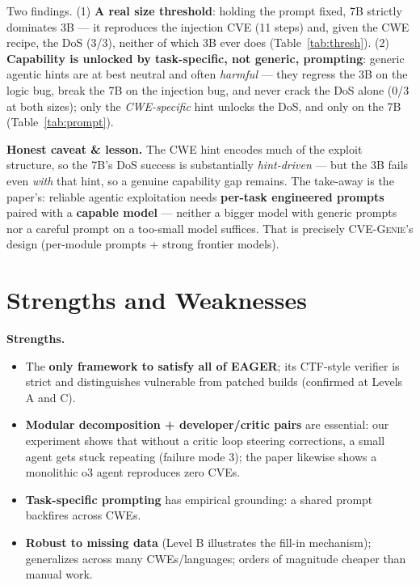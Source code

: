 \documentclass[conference,10pt,a4paper]{IEEEtran}
\begin{document}
Two findings. (1) \textbf{A real size threshold}: holding the prompt fixed, 7B strictly dominates 3B --- it reproduces the injection CVE (11 steps) and, given the CWE recipe, the DoS (3/3), neither of which 3B ever does (Table~\ref{tab:thresh}). (2) \textbf{Capability is unlocked by task-specific, not generic, prompting}: generic agentic hints are at best neutral and often \textit{harmful} --- they regress the 3B on the logic bug, break the 7B on the injection bug, and never crack the DoS alone (0/3 at both sizes); only the \textit{CWE-specific} hint unlocks the DoS, and only on the 7B (Table~\ref{tab:prompt}).

\textbf{Honest caveat \& lesson.} The CWE hint encodes much of the exploit structure, so the 7B's DoS success is substantially \textit{hint-driven} --- but the 3B fails even \textit{with} that hint, so a genuine capability gap remains. The take-away is the paper's: reliable agentic exploitation needs \textbf{per-task engineered prompts} paired with a \textbf{capable model} --- neither a bigger model with generic prompts nor a careful prompt on a too-small model suffices. That is precisely CVE-G\textsc{enie}'s design (per-module prompts + strong frontier models).

\section{Strengths and Weaknesses}

\textbf{Strengths.}
\begin{itemize}
\item The \textbf{only framework to satisfy all of EAGER}; its CTF-style verifier is strict and distinguishes vulnerable from patched builds (confirmed at Levels A and C).
\item \textbf{Modular decomposition + developer/critic pairs} are essential: our experiment shows that without a critic loop steering corrections, a small agent gets stuck repeating (failure mode 3); the paper likewise shows a monolithic o3 agent reproduces zero CVEs.
\item \textbf{Task-specific prompting} has empirical grounding: a shared prompt backfires across CWEs.
\item \textbf{Robust to missing data} (Level B illustrates the fill-in mechanism); generalizes across many CWEs/languages; orders of magnitude cheaper than manual work.
\end{itemize}
\end{document}
